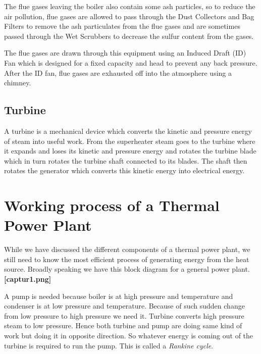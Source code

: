 \documentclass{report}
\begin{document}
The flue gases leaving the boiler also contain some ash particles, so to reduce the air pollution, flue gases are allowed to pass through the Dust Collectors and Bag Filters to remove the ash particulates from the flue gases and are sometimes passed through the Wet Scrubbers to decrease the sulfur content from the gases.

The flue gases are drawn through this equipment using an Induced Draft (ID) Fan which is designed for a fixed capacity and head to prevent any back pressure. After the ID fan, flue gases are exhausted off into the atmosphere using a chimney.

\subsection{Turbine}
A turbine is a mechanical device which converts the kinetic and pressure energy of steam into useful work. From the superheater steam goes to the turbine where it expands and loses its kinetic and pressure energy and rotates the turbine blade which in turn rotates the turbine shaft connected to its blades. The shaft then rotates the generator which converts this kinetic energy into electrical energy.

\section{Working process of a Thermal Power Plant}
While we have discussed the different components of a thermal power plant, we still need to know the most efficient process of generating energy from the heat source. Broadly speaking we have this block diagram for a general power plant.
\\
{\bf [captur1.png]}
\par A pump is needed because boiler is at high pressure and temperature and condenser is at low pressure and temperature. Because of such sudden change from low pressure to high pressure we need it. Turbine converts high pressure steam to low pressure. Hence both turbine and pump are doing same kind of work but doing it in opposite direction. So whatever energy is coming out of the turbine is required to run the pump. This is called a {\it Rankine cycle}. 
\end{document}
